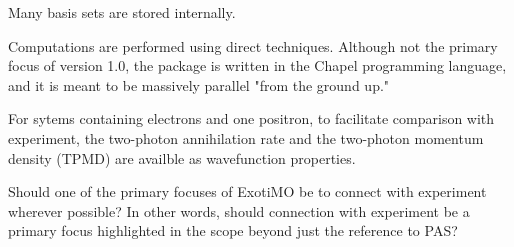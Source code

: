 Many basis sets are stored internally.

Computations are performed using direct techniques. Although not the primary focus of version 1.0, 
the package is written in the Chapel programming language, and it is meant to be massively parallel 
"from the ground up." 

For sytems containing electrons and one positron, to facilitate comparison with experiment, the 
two-photon annihilation rate and the 
two-photon momentum density (TPMD) are availble as wavefunction properties.

\begin{openissue}
Should one of the primary focuses of ExotiMO be to connect with experiment wherever possible? In other words,
should connection with experiment be a primary focus highlighted in the scope beyond just the reference to
PAS?
\end{openissue}
